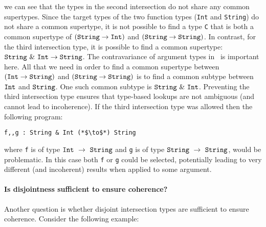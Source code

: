 \noindent we can see that the types in the 
second intersection do not share any common supertypes. Since the
target types of the two function types
(\lstinline$Int$ and \lstinline$String$) do not share a common
supertype, 
it is not possible to find a type \lstinline$C$ that is both a common
supertype of $(\texttt{String} \to \texttt{Int})$ and $(\texttt{String} \to \texttt{String})$.
In contrast, for the third intersection type, it is possible to find a 
common supertype: $\texttt{String}~\&~\texttt{Int} \to
\texttt{String}$. The contravariance of argument types
in ~is important here. All that we need in order to find a common supertype 
between $(\texttt{Int} \to \texttt{String})$ and $(\texttt{String} \to
\texttt{String})$ is to find a common subtype between $\texttt{Int}$ and 
$\texttt{String}$. One such common subtype is
$\texttt{String}~\&~\texttt{Int}$. Preventing the third intersection
type ensures that type-based lookups are not ambiguous (and cannot
lead to incoherence). If the third intersection type was allowed then
the following program:

\begin{lstlisting}
f,,g : String & Int (*$\to$*) String
\end{lstlisting}

\noindent where \lstinline$f$ is of type
$\texttt{Int}~\to~\texttt{String}$  and \lstinline$g$ is of type
$\texttt{String}~\to~\texttt{String}$, would be problematic. In this 
case both \lstinline$f$ or \lstinline$g$ could be selected,
potentially leading to very different (and incoherent) results when
applied to some argument. 

\begin{comment}
According to the rule the first 
two intersection types are disjoint, whereas the last one is not. This 
rule is justified in Section~\ref{}.\bruno{Should we stop here; or briefly argue 
about some justification} 

This paper proposes the 
following rule for determining the disjointness of two function types:

\begin{mathpar}
    \ruledisfun
\end{mathpar}

\noindent Here $*_i$ denotes disjointness. 
\end{comment}

\paragraph {Is disjointness sufficient to ensure coherence?} Another question
is whether disjoint intersection types are sufficient to ensure coherence. 
Consider the following example:

